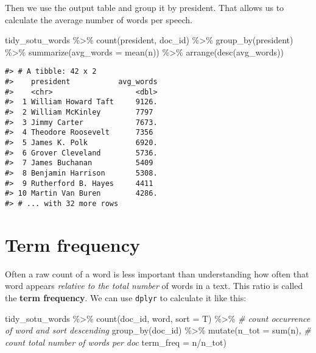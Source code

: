 \documentclass[
]{book}
\newenvironment{Shaded}{\begin{snugshade}}{\end{snugshade}}
\newcommand{\AttributeTok}[1]{\textcolor[rgb]{0.77,0.63,0.00}{#1}}
\newcommand{\CommentTok}[1]{\textcolor[rgb]{0.56,0.35,0.01}{\textit{#1}}}
\newcommand{\FunctionTok}[1]{\textcolor[rgb]{0.00,0.00,0.00}{#1}}
\newcommand{\NormalTok}[1]{#1}
\newcommand{\SpecialCharTok}[1]{\textcolor[rgb]{0.00,0.00,0.00}{#1}}
\begin{document}
Then we use the output table and group it by president. That allows us to calculate the average number of words per speech.

\begin{Shaded}
\begin{Highlighting}[]
\NormalTok{tidy\_sotu\_words }\SpecialCharTok{\%\textgreater{}\%}
  \FunctionTok{count}\NormalTok{(president, doc\_id)  }\SpecialCharTok{\%\textgreater{}\%} 
  \FunctionTok{group\_by}\NormalTok{(president) }\SpecialCharTok{\%\textgreater{}\%} 
  \FunctionTok{summarize}\NormalTok{(}\AttributeTok{avg\_words =} \FunctionTok{mean}\NormalTok{(n)) }\SpecialCharTok{\%\textgreater{}\%} 
  \FunctionTok{arrange}\NormalTok{(}\FunctionTok{desc}\NormalTok{(avg\_words))}
\end{Highlighting}
\end{Shaded}

\begin{verbatim}
#> # A tibble: 42 x 2
#>    president           avg_words
#>    <chr>                   <dbl>
#>  1 William Howard Taft     9126.
#>  2 William McKinley        7797 
#>  3 Jimmy Carter            7673.
#>  4 Theodore Roosevelt      7356 
#>  5 James K. Polk           6920.
#>  6 Grover Cleveland        5736.
#>  7 James Buchanan          5409 
#>  8 Benjamin Harrison       5308.
#>  9 Rutherford B. Hayes     4411 
#> 10 Martin Van Buren        4286.
#> # ... with 32 more rows
\end{verbatim}

\hypertarget{term-frequency}{%
\section{Term frequency}\label{term-frequency}}

Often a raw count of a word is less important than understanding how often that word appears \emph{relative to the total number} of words in a text. This ratio is called the \textbf{term frequency}. We can use \texttt{dplyr} to calculate it like this:

\begin{Shaded}
\begin{Highlighting}[]
\NormalTok{tidy\_sotu\_words }\SpecialCharTok{\%\textgreater{}\%}
  \FunctionTok{count}\NormalTok{(doc\_id, word, }\AttributeTok{sort =}\NormalTok{ T)  }\SpecialCharTok{\%\textgreater{}\%}  \CommentTok{\# count occurrence of word and sort descending}
  \FunctionTok{group\_by}\NormalTok{(doc\_id) }\SpecialCharTok{\%\textgreater{}\%} 
  \FunctionTok{mutate}\NormalTok{(}\AttributeTok{n\_tot =} \FunctionTok{sum}\NormalTok{(n),              }\CommentTok{\# count total number of words per doc}
         \AttributeTok{term\_freq =}\NormalTok{ n}\SpecialCharTok{/}\NormalTok{n\_tot)}
\end{Highlighting}
\end{Shaded}
\end{document}

